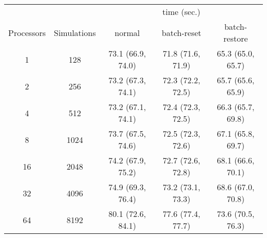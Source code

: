 \begin{tabular}{ccccc}
\toprule
& & \multicolumn{3}{c}{time (sec.)} \\
\cmidrule{3-5}
Processors & Simulations & normal & batch-reset & batch-restore \\
\midrule
1 & 128 & 73.1 (66.9, 74.0) & 71.8 (71.6, 71.9) & 65.3 (65.0, 65.7) \\
2 & 256 & 73.2 (67.3, 74.1) & 72.3 (72.2, 72.5) & 65.7 (65.6, 65.9) \\
4 & 512 & 73.2 (67.1, 74.1) & 72.4 (72.3, 72.5) & 66.3 (65.7, 69.8) \\
8 & 1024 & 73.7 (67.5, 74.6) & 72.5 (72.3, 72.6) & 67.1 (65.8, 69.7) \\
16 & 2048 & 74.2 (67.9, 75.2) & 72.7 (72.6, 72.8) & 68.1 (66.6, 70.1) \\
32 & 4096 & 74.9 (69.3, 76.4) & 73.2 (73.1, 73.3) & 68.6 (67.0, 70.8) \\
64 & 8192 & 80.1 (72.6, 84.1) & 77.6 (77.4, 77.7) & 73.6 (70.5, 76.3) \\
\bottomrule
\end{tabular}
